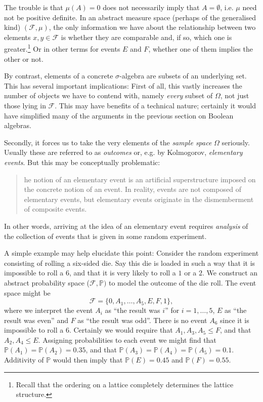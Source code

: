 \documentclass[article, a4paper, 11pt, oneside]{memoir}
\numberwithin{equation}{chapter}
\newcommand{\calF}{\mathcal{F}}
\renewcommand{\P}{\mathbb{P}}
\begin{document}
The trouble is that $\mu(A) = 0$ does not necessarily imply that $A = \emptyset$, i.e. $\mu$ need not be positive definite. In an abstract measure space (perhaps of the generalised kind) $(\calF,\mu)$, the only information we have about the relationship between two elements $x,y \in \calF$ is whether they are comparable and, if so, which one is greater.\footnote{Recall that the ordering on a lattice completely determines the lattice structure.} Or in other terms for events $E$ and $F$, whether one of them implies the other or not.

By contrast, elements of a concrete $\sigma$-algebra are subsets of an underlying set. This has several important implications: First of all, this vastly increases the number of objects we have to contend with, namely \emph{every} subset of $\Omega$, not just those lying in $\calF$. This may have benefits of a technical nature; certainly it would have simplified many of the arguments in the previous section on Boolean algebras.

Secondly, it forces us to take the very elements of the \emph{sample space} $\Omega$ seriously. Usually these are referred to as \emph{outcomes} or, e.g. by Kolmogorov, \emph{elementary events}. But this may be conceptually problematic:
%
\blockquote[\cite{kolmogorov1995}]{
    he notion of an elementary event is an artificial superstructure imposed on the concrete notion of an event. In reality, events are not composed of elementary events, but elementary events originate in the dismemberment of composite events.
}
%
In other words, arriving at the idea of an elementary event requires \emph{analysis} of the collection of events that is given in some random experiment.

A simple example may help elucidate this point: Consider the random experiment consisting of rolling a six-sided die. Say this die is loaded in such a way that it is impossible to roll a $6$, and that it is very likely to roll a $1$ or a $2$. We construct an abstract probability space ($\calF, \P)$ to model the outcome of the die roll. The event space might be
%
\begin{equation*}
    \calF
        = \{ 0, A_1, \ldots, A_5, E, F, 1 \},
\end{equation*}
%
where we interpret the event $A_i$ as \enquote{the result was $i$} for $i = 1, \ldots, 5$, $E$ as \enquote{the result was even} and $F$ as \enquote{the result was odd}. There is no event $A_6$ since it is impossible to roll a $6$. Certainly we would require that $A_1, A_3, A_5 \leq F$, and that $A_2, A_4 \leq E$. Assigning probabilities to each event we might find that $\P(A_1) = \P(A_2) = 0.35$, and that $\P(A_3) = \P(A_4) = \P(A_5) = 0.1$. Additivity of $\P$ would then imply that $\P(E) = 0.45$ and $\P(F) = 0.55$.
\end{document}
